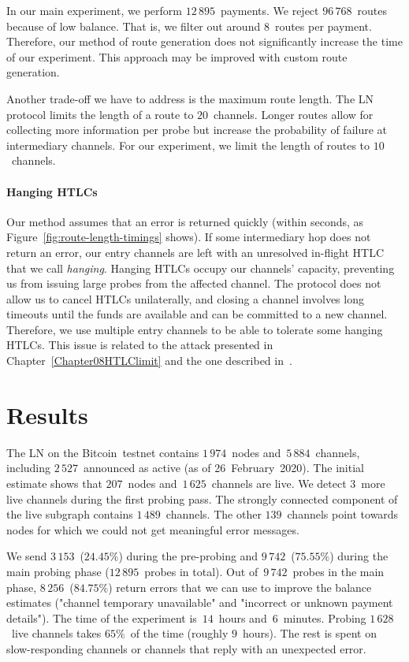 In our main experiment, we perform $12\,895$~payments.
We reject $96\,768$~routes because of low balance.
That is, we filter out around $8$~routes per payment.
Therefore, our method of route generation does not significantly increase the time of our experiment.
This approach may be improved with custom route generation.

Another trade-off we have to address is the maximum route length.
The LN protocol limits the length of a route to $20$~channels.
Longer routes allow for collecting more information per probe but increase the probability of failure at intermediary channels.
For our experiment, we limit the length of routes to $10$~channels.

\paragraph{Hanging HTLCs}
Our method assumes that an error is returned quickly (within seconds, as Figure~\ref{fig:route-length-timings} shows).
If some intermediary hop does not return an error, our entry channels are left with an unresolved in-flight HTLC that we call \textit{hanging}.
Hanging HTLCs occupy our channels' capacity, preventing us from issuing large probes from the affected channel.
The protocol does not allow us to cancel HTLCs unilaterally, and closing a channel involves long timeouts until the funds are available and can be committed to a new channel.
Therefore, we use multiple entry channels to be able to tolerate some hanging HTLCs.
This issue is related to the attack presented in Chapter~\ref{Chapter08HTLClimit} and the one described in~\cite{Mizrahi2020}.

\section{Results} \label{sec:results}

The LN on the Bitcoin~testnet contains $1\,974$~nodes and~$5\,884$~channels, including $2\,527$~announced as active (as of 26~February~2020).
The initial estimate shows that $207$~nodes and~$1\,625$~channels are live.
We detect $3$~more live channels during the first probing pass.
The strongly connected component of the live subgraph contains $1\,489$~channels.
The other $139$~channels point towards nodes for which we could not get meaningful error messages.

We send $3\,153$~($24.45\%$) during the pre-probing and $9\,742$~($75.55\%$) during the main probing phase ($12\,895$~probes in total).
Out of~$9\,742$~probes in the main phase, $8\,256$~($84.75\%$) return errors that we can use to improve the balance estimates ("channel temporary unavailable" and "incorrect or unknown payment details").
The time of the experiment is~$14$~hours and~$6$~minutes.
Probing $1\,628$~live channels takes $65\%$~of the time (roughly $9$~hours).
The rest is spent on slow-responding channels or channels that reply with an unexpected error.


